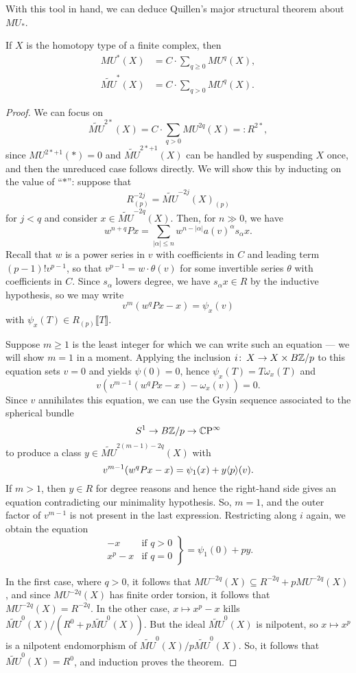 With this tool in hand, we can deduce Quillen's major structural theorem about $MU_*$.
\begin{theorem}
If $X$ is the homotopy type of a finite complex, then
\begin{align*}
MU^*(X) & = C \cdot \sum_{q \ge 0} MU^q(X), \\
\widetilde{MU}^*(X) & = C \cdot \sum_{q > 0} MU^q(X).
\end{align*}
\end{theorem}
\begin{proof}
We can focus on \[\widetilde{MU}^{2*}(X) = C \cdot \sum_{q > 0} MU^{2q}(X) =: R^{2*},\] since $MU^{2*+1}(*) = 0$ and $\widetilde{MU}^{2*+1}(X)$ can be handled by suspending $X$ once, and then the unreduced case follows directly.  We will show this by inducting on the value of ``$*$'': suppose that \[R^{-2j}_{(p)} = \widetilde{MU}^{-2j}(X)_{(p)}\] for $j < q$ and consider $x \in \widetilde{MU}^{-2q}(X)$.  Then, for $n \gg 0$, we have \[w^{n+q} P x = \sum_{|\alpha| \le n} w^{n - |\alpha|} a(v)^\alpha s_\alpha x.\]  Recall that $w$ is a power series in $v$ with coefficients in $C$ and leading term $(p-1)! v^{p-1}$, so that $v^{p-1} = w \cdot \theta(v)$ for some invertible series $\theta$ with coefficients in $C$.  Since $s_\alpha$ lowers degree, we have $s_\alpha x \in R$ by the inductive hypothesis, so we may write \[v^m(w^qPx - x) = \psi_x(v)\] with $\psi_x(T) \in R_{(p)}\llbracket T \rrbracket$.

Suppose $m \ge 1$ is the least integer for which we can write such an equation --- we will show $m = 1$ in a moment.  Applying the inclusion $i\colon\thinspace X \to X \times B\mathbb Z/p$ to this equation sets $v = 0$ and yields $\psi(0) = 0$, hence $\psi_x(T) = T \omega_x(T)$ and \[v (v^{m-1}(w^qPx - x) - \omega_x(v)) = 0.\]  Since $v$ annihilates this equation, we can use the Gysin sequence associated to the spherical bundle \[S^1 \to B\mathbb Z/p \to \mathbb{C}\mathrm P^\infty\] to produce a class $y \in \widetilde{MU}^{2(m-1)-2q}(X)$ with \[v^{m-1}(w^q P x - x) = \psi_1(x) + y \langle p\rangle(v).\]  If $m > 1$, then $y \in R$ for degree reasons and hence the right-hand side gives an equation contradicting our minimality hypothesis.  So, $m = 1$, and the outer factor of $v^{m-1}$ is not present in the last expression.  Restricting along $i$ again, we obtain the equation \[\left. \begin{array}{rr} -x & \text{if $q > 0$} \\ x^p - x & \text{if $q = 0$} \end{array} \right\} = \psi_1(0) + py.\]

In the first case, where $q > 0$, it follows that $MU^{-2q}(X) \subseteq R^{-2q} + pMU^{-2q}(X)$, and since $MU^{-2q}(X)$ has finite order torsion, it follows that $MU^{-2q}(X) = R^{-2q}$.  In the other case, $x \mapsto x^p - x$ kills $\widetilde{MU}^0(X)/(R^0 + p\widetilde{MU}^0(X))$.  But the ideal $\widetilde{MU}^0(X)$ is nilpotent, so $x \mapsto x^p$ is a nilpotent endomorphism of $\widetilde{MU}^0(X) / p\widetilde{MU}^0(X)$.  So, it follows that $\widetilde{MU}^0(X) = R^0$, and induction proves the theorem.
\end{proof}

